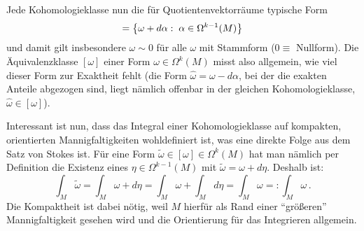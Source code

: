 \documentclass[../H_Analysis_main.tex]{subfiles}
\begin{document}
Jede Kohomologieklasse nun die für Quotientenvektorräume typische Form
\begin{equation}
[\omega] = \qty{\omega + d\alpha: \; \alpha \in \Omega^{k - 1}(M)}
\end{equation}
und damit gilt insbesondere $\omega \sim 0$ für alle $\omega$ mit Stammform ($0 \equiv$ Nullform). Die Äquivalenzklasse $[\omega]$ einer Form $\omega \in \Omega^k(M)$ misst also allgemein, wie viel dieser Form zur Exaktheit fehlt (die Form $\hat{\omega} = \omega - d\alpha$, bei der die exakten Anteile abgezogen sind, liegt nämlich offenbar in der gleichen Kohomologieklasse, $\hat{\omega} \in [\omega]$).



Interessant ist nun, dass das Integral einer Kohomologieklasse auf kompakten, orientierten Mannigfaltigkeiten wohldefiniert ist, was eine direkte Folge aus dem Satz von Stokes ist. Für eine Form $\tilde{\omega} \in [\omega] \in \Omega^k(M)$ hat man nämlich per Definition die Existenz eines $\eta \in \Omega^{k - 1}(M)$ mit $\tilde{\omega} = \omega + d\eta$. Deshalb ist:
\begin{equation}
\int_M \tilde{\omega} = \int_M \omega + d\eta = \int_M \omega + \int_M d\eta = \int_M \omega =: \int_M \omega \, .
\end{equation}
Die Kompaktheit ist dabei nötig, weil $M$ hierfür als Rand einer \enquote{größeren} Mannigfaltigkeit gesehen wird und die Orientierung für das Integrieren allgemein.

\end{document}
